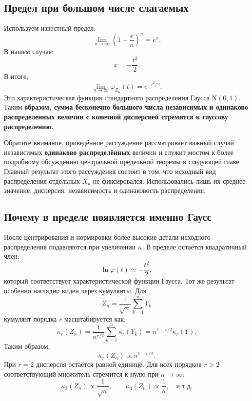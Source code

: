 \documentclass[
  russian,
  12pt,
  a4paper,
  a4paper,
  openany]{scrbook}
\begin{document}
\subsection{Предел при большом числе
слагаемых}\label{ux43fux440ux435ux434ux435ux43b-ux43fux440ux438-ux431ux43eux43bux44cux448ux43eux43c-ux447ux438ux441ux43bux435-ux441ux43bux430ux433ux430ux435ux43cux44bux445}

Используем известный предел: \[\lim_{n\to\infty}
\left(1+\frac{x}{n}\right)^n
=e^x.\] В нашем случае: \[x=-\frac{t^2}{2}.\] В итоге, \[\boxed{
\lim_{n\to\infty}
\varphi_{Z_n}(t)
=
e^{-t^2/2}.
}\] Это характеристическая функция стандартного распределения Гаусса
\(\mathrm{N}(0,1)\). Таким \textbf{образом, сумма бесконечно большого
числа независимых и одинаково распределенных величин с конечной
дисперсией стремится к гауссову распределению.}

Обратите внимание, приведённое рассуждение рассматривает важный случай
независимых \textbf{одинаково распределённых} величин и служит мостом к
более подробному обсуждению центральной предельной теоремы в следующей
главе. Главный результат этого рассуждения состоит в том, что исходный
вид распределения отдельных \(X_k\) не фиксировался. Использовались лишь
их среднее значение, дисперсия, независимость и одинаковость
распределения.

\subsection{Почему в пределе появляется именно
Гаусс}\label{ux43fux43eux447ux435ux43cux443-ux432-ux43fux440ux435ux434ux435ux43bux435-ux43fux43eux44fux432ux43bux44fux435ux442ux441ux44f-ux438ux43cux435ux43dux43dux43e-ux433ux430ux443ux441ux441}

После центрирования и нормировки более высокие детали исходного
распределения подавляются при увеличении \(n\). В пределе остаётся
квадратичный член: \[\ln\varphi(t)
\simeq
-\frac{t^2}{2},\] который соответствует характеристической функции
Гаусса. Тот же результат особенно наглядно виден через кумулянты. Для
\[Z_n
=
\frac{1}{\sqrt n}
\sum_{k=1}^{n}Y_k\] кумулянт порядка \(r\) масштабируется как:
\[\kappa_r(Z_n)=
\frac{1}{n^{r/2}}
\sum_{k=1}^{n}\kappa_r(Y_k) =
n^{1-r/2}\kappa_r(Y).\] Таким образом, \[\boxed{
\kappa_r(Z_n)
\propto
n^{1-r/2}.
}\] При \(r=2\) дисперсия остаётся равной единице. Для всех порядков
\(r>2\) соответствующий множитель стремится к нулю при \(n\to\infty\):
\[\kappa_3(Z_n)\propto\frac{1}{\sqrt n},
\qquad
\kappa_4(Z_n)\propto\frac{1}{n}, \quad \text{и т.д.}\]
\end{document}
